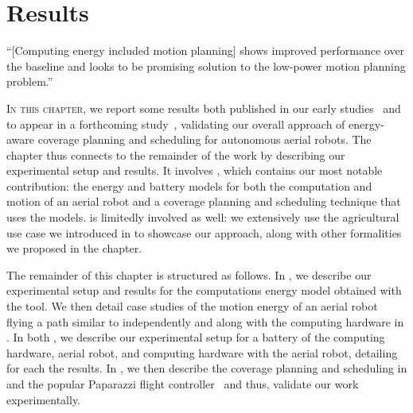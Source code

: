
%
%
%
%
\chapter{Results}
\label{cp:res}

\begin{chapquote}{\cite{sudhakar2020balancing}}
  ``[Computing energy included motion planning] shows improved performance over the baseline and looks to be promising solution to the low-power motion planning problem.''
\end{chapquote}

\vspace*{1em}

\lettrine{I}{n this chapter}, we report some results both published in our early studies~\citep{seewald2019coarse,seewald2020mechanical} and to appear in a forthcoming study~\citep{seewald202Xenergy}, validating our overall approach of energy-aware coverage planning and scheduling for autonomous aerial robots. The chapter thus connects to the remainder of the work by describing our experimental setup and results. It involves , which contains our most notable contribution: the energy and battery models for both the computation and motion of an aerial robot and a coverage planning and scheduling technique that uses the models.  is limitedly involved as well: we extensively use the agricultural use case we introduced in  to showcase our approach, along with other formalities we proposed in the chapter.

The remainder of this chapter is structured as follows. In , we describe our experimental setup and results for the computations energy model obtained with the \powprof{} tool. We then detail case studies of the motion energy of an aerial robot flying a path similar to  independently and along with the computing hardware in . In both , we describe our experimental setup for a battery of the computing hardware, aerial robot, and computing hardware with the aerial robot, detailing for each the results. In , we then describe the coverage planning and scheduling in \matlab and the popular Paparazzi flight controller~\citep{papa} and thus, validate our work experimentally.


